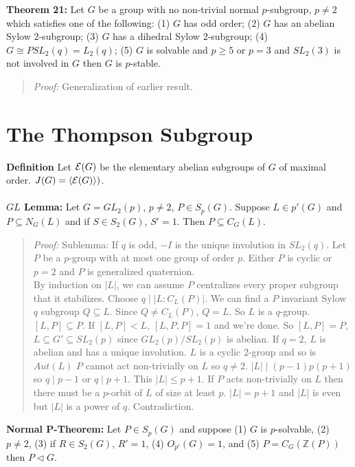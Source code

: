 {\bf Theorem 21:}
Let $G$ be a group with no non-trivial normal $p$-subgroup, $p \ne 2$ which satisfies one of
the following:
(1) $G$ has odd order;
(2) $G$ has an abelian Sylow $2$-subgroup;
(3) $G$ has a dihedral Sylow $2$-subgroup;
(4) $G \cong PSL_2(q) = L_2(q)$;
(5) $G$ is solvable and $p \ge 5$ or $p=3$ and $SL_2(3)$ is not involved in $G$
then $G$ is $p$-stable.
\begin{quote}
\emph{Proof:}  
Generalization of earlier result.
\end{quote}
\section{The Thompson Subgroup}
{\bf Definition} Let ${\cal E}(G)$ be the elementary abelian subgroups of $G$ of maximal order.
$J(G)= \langle {\cal E}(G) \rangle)$.
\\
\\
{\bf $GL$ Lemma:} Let $G= GL_2(p)$, $p \neq 2$, $P \in S_p(G)$.  Suppose $L \in p'(G)$ and $P \subseteq N_G(L)$ and
if $S \in S_2(G)$, $S'=1$.  Then $P \subseteq C_G(L)$.
\begin{quote}
\emph{Proof:}   Sublemma: If $q$ is odd, $-I$ is the unique involution in $SL_2(q)$.  Let $P$ be
a $p$-group with at most one group of order $p$.  Either $P$ is cyclic or $p=2$ and
$P$ is generalized quaternion.
\\
By induction on $|L|$, we can assume $P$ centralizes every proper subgroup that it stabilizes.
Choose $q \mid |L:C_L(P)|$.  We can find a $P$ invariant Sylow $q$ subgroup $Q \subseteq L$.
Since $Q \neq C_L(P)$, $Q=L$.  So $L$ is a $q$-group.  $[L, P] \subseteq P$.
If $[L,P] < L$, $[L,P,P]=1$ and we're done.  So $[L,P]=P$, $L \subseteq G' \subseteq SL_2(p)$ since
$GL_2(p)/SL_2(p)$ is abelian.  If $q = 2$, $L$ is abelian and has a unique involution.
$L$ is a cyclic $2$-group and so is $Aut(L)$  $P$ cannot act non-trivially on $L$ so $q \neq 2$.
$|L| \mid (p-1)p(p+1)$ so $q \mid p-1$ or $q \mid p+1$. This $|L| \leq p+1$.  If $P$ acts non-trivially on $L$
then there must be a $p$-orbit of $L$ of size at least $p$. $|L|=p+1$ and $|L|$ is even but
$|L|$ is a power of $q$.  Contradiction.
\end{quote}
{\bf Normal P-Theorem:} Let $P \in S_p(G)$ and suppose (1) $G$ is $p$-solvable, (2) $p \ne 2$, (3) if
$R \in S_2(G)$, $R' = 1$, (4) $O_{p'}(G) = 1$, and (5) $P = C_G({\mathbb Z}(P))$ then $P \lhd G$.
